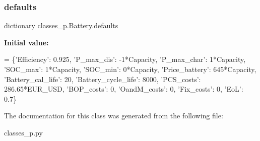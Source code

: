 \subsubsection{\texorpdfstring{defaults}{defaults}}
{\footnotesize\ttfamily dictionary classes\+\_\+p.\+Battery.\+defaults\hspace{0.3cm}{\ttfamily [static]}}

{\bfseries Initial value\+:}
\begin{DoxyCode}
=  \{\textcolor{stringliteral}{'Efficiency'}: 0.925,
                \textcolor{stringliteral}{'P\_max\_dis'}: -1*Capacity,
                \textcolor{stringliteral}{'P\_max\_char'}: 1*Capacity,
                \textcolor{stringliteral}{'SOC\_max'}: 1*Capacity,
                \textcolor{stringliteral}{'SOC\_min'}: 0*Capacity,
                \textcolor{stringliteral}{'Price\_battery'}: 645*Capacity,
                \textcolor{stringliteral}{'Battery\_cal\_life'}: 20,
                \textcolor{stringliteral}{'Battery\_cycle\_life'}: 8000,
                \textcolor{stringliteral}{'PCS\_costs'}: 286.65*EUR\_USD,
                \textcolor{stringliteral}{'BOP\_costs'}: 0,
                \textcolor{stringliteral}{'OandM\_costs'}: 0,
                \textcolor{stringliteral}{'Fix\_costs'}: 0,
                \textcolor{stringliteral}{'EoL'}: 0.7\}
\end{DoxyCode}


The documentation for this class was generated from the following file\+:\begin{DoxyCompactItemize}
\item 
classes\+\_\+p.\+py\end{DoxyCompactItemize}
